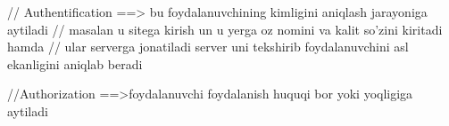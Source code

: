 // Authentification ==> bu foydalanuvchining kimligini aniqlash jarayoniga aytiladi
// masalan u sitega kirish un  u yerga oz nomini va kalit so'zini kiritadi hamda
// ular serverga jonatiladi server uni tekshirib  foydalanuvchini asl ekanligini aniqlab beradi


//Authorization ==>foydalanuvchi foydalanish huquqi bor yoki yoqligiga aytiladi